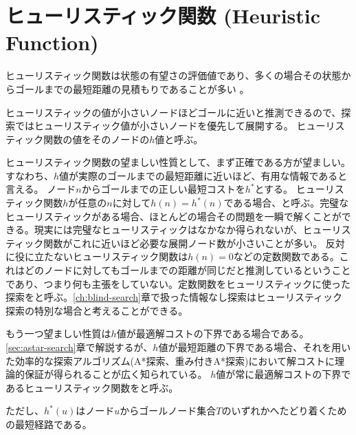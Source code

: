 \section{ヒューリスティック関数 (Heuristic Function)}
\label{sec:heuristic-function}
ヒューリスティック関数は状態の有望さの評価値であり、多くの場合その状態からゴールまでの最短距離の見積もりであることが多い \cite{hart68formal}。

ヒューリスティックの値が小さいノードほどゴールに近いと推測できるので、探索ではヒューリスティック値が小さいノードを優先して展開する。
ヒューリスティック関数の値をそのノードの$h$値と呼ぶ。

ヒューリスティック関数の望ましい性質として、まず正確である方が望ましい。すなわち、$h$値が実際のゴールまでの最短距離に近いほど、有用な情報であると言える。
ノード$n$からゴールまでの正しい最短コストを$h^*$とする。
ヒューリスティック関数$h$が任意の$n$に対して$h(n) = h^*(n)$である場合、と呼ぶ。完璧なヒューリスティックがある場合、ほとんどの場合その問題を一瞬で解くことができる。現実には完璧なヒューリスティックはなかなか得られないが、ヒューリスティック関数がこれに近いほど必要な展開ノード数が小さいことが多い\cite{helmert:08}。
反対に役に立たないヒューリスティック関数は$h(n) = 0$などの定数関数である。これはどのノードに対してもゴールまでの距離が同じだと推測しているということであり、つまり何も主張をしていない。定数関数をヒューリスティックに使った探索をと呼ぶ。\ref{ch:blind-search}章で扱った情報なし探索はヒューリスティック探索の特別な場合と考えることができる。


もう一つ望ましい性質は$h$値が最適解コストの下界である場合である。
\ref{sec:astar-search}章で解説するが、$h$値が最短距離の下界である場合、それを用いた効率的な探索アルゴリズム(A*探索、重み付きA*探索)において解コストに理論的保証が得られることが広く知られている。
$h$値が常に最適解コストの下界であるヒューリスティック関数をと呼ぶ。


ただし、$h^*(u)$はノード$u$からゴールノード集合$T$のいずれかへたどり着くための最短経路である。%


